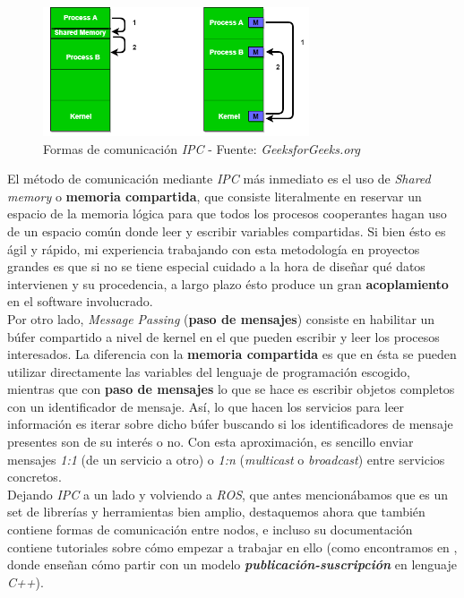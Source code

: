 \begin{figure}[h]
	\centering
	\includegraphics[width=0.7\textwidth]{imagenes/ipc.png}
	\caption{Formas de comunicación \textit{IPC} - Fuente: \textit{GeeksforGeeks.org} \cite{ipc}}
	\label{ipc-img}
\end{figure}

El método de comunicación mediante \textit{IPC} más inmediato es el uso de \textit{Shared memory} o \textbf{memoria compartida}, que consiste literalmente en reservar un espacio de la memoria lógica para que todos los procesos cooperantes hagan uso de un espacio común donde leer y escribir variables compartidas. Si bien ésto es ágil y rápido, mi experiencia trabajando con esta metodología en proyectos grandes es que si no se tiene especial cuidado a la hora de diseñar qué datos intervienen y su procedencia, a largo plazo ésto produce un gran \textbf{acoplamiento} en el software involucrado.\\

Por otro lado, \textit{Message Passing} (\textbf{paso de mensajes}) consiste en habilitar un búfer compartido a nivel de kernel en el que pueden escribir y leer los procesos interesados. La diferencia con la \textbf{memoria compartida} es que en ésta se pueden utilizar directamente las variables del lenguaje de programación escogido, mientras que con \textbf{paso de mensajes} lo que se hace es escribir objetos completos con un identificador de mensaje. Así, lo que hacen los servicios para leer información es iterar sobre dicho búfer buscando si los identificadores de mensaje presentes son de su interés o no. Con esta aproximación, es sencillo enviar mensajes \textit{1:1} (de un servicio a otro) o \textit{1:n} (\textit{multicast} o \textit{broadcast}) entre servicios concretos.\\

Dejando \textit{IPC} a un lado y volviendo a \textit{ROS}, que antes mencionábamos que es un set de librerías y herramientas bien amplio, destaquemos ahora que también contiene formas de comunicación entre nodos, e incluso su documentación contiene tutoriales sobre cómo empezar a trabajar en ello (como encontramos en \cite{ros-tutorial}, donde enseñan cómo partir con un modelo \textbf{\textit{publicación-suscripción}} en lenguaje \textit{C++}).\\


